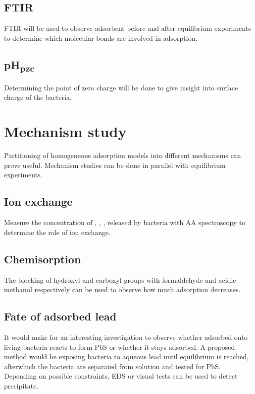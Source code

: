 \documentclass[hidelinks,12pt,a4paper]{article}
\begin{document}
	\subsection{FTIR}
	
	FTIR will be used to observe adsorbent before and after equilibrium experiments to determine which molecular bonds are involved in adsorption.
	
	\subsection{pH\textsubscript{pzc}}
	
	Determining the point of zero charge will be done to give insight into surface charge of the bacteria.
	
	\section{Mechanism study}
	
	Partitioning of homogeneous adsorption models into different mechanisms can prove useful. Mechanism studies can be done in parallel with equilibrium experiments.
	
	\subsection{Ion exchange}
	
	Measure the concentration of , , ,  released by bacteria with AA spectroscopy to determine the role of ion exchange.
	
	\subsection{Chemisorption}
	
	The blocking of hydroxyl and carboxyl groups with formaldehyde and acidic methanol respectively can be used to observe how much adsorption decreases. 
	
	\subsection{Fate of adsorbed lead}
	
	It would make for an interesting investigation to observe whether  adsorbed onto living bacteria reacts to form PbS or whether it stays adsorbed. A proposed method would be exposing bacteria to aqueous lead until equilibrium is reached, afterwhich the bacteria are separated from solution and tested for PbS. Depending on possible constraints, EDS or visual tests can be used to detect precipitate.
	
\end{document}
